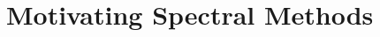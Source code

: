 \documentclass{article}
\theoremstyle{plain}
\numberwithin{equation}{section}
\theoremstyle{definition}
\theoremstyle{remark}
\begin{document}


    

    



\section{Motivating Spectral Methods}
\label{section:warm-up}
\end{document}
